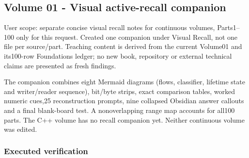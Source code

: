 \subsection{Volume 01 - Visual active-recall companion}\label{appendix-a103e7846d21-volume-01---visual-active-recall-companion}

User scope: separate concise visual recall notes for continuous volumes, Parts1--100 only for this request. Created one companion under Visual Recall, not one file per source/part. Teaching content is derived from the current Volume01 and its100-row Foundations ledger; no new book, repository or external technical claims are presented as fresh findings.

The companion combines eight Mermaid diagrams (flows, classifier, lifetime state and writer/reader sequence), bit/byte strips, exact comparison tables, worked numeric cues,25 reconstruction prompts, nine collapsed Obsidian answer callouts and a final blank-board test. A nonoverlapping range map accounts for all100 parts. The C++ volume has no recall companion yet. Neither continuous volume was edited.

\subsubsection{Executed verification}\label{appendix-a103e7846d21-executed-verification}

